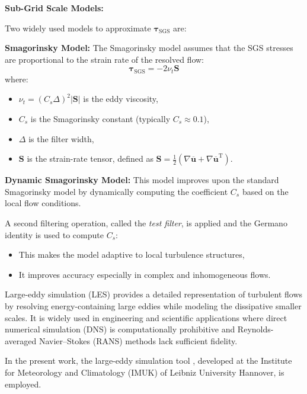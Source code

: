 \begin{tcolorbox}[colback=blue!5!white, colframe=blue!75!black]
\textbf{Sub-Grid Scale Models:}

Two widely used models to approximate $\boldsymbol{\tau}_{\mathrm{SGS}}$ are:

\vspace{1mm}
\textbf{Smagorinsky Model:} 
The Smagorinsky model assumes that the SGS stresses are proportional to the strain rate of the resolved flow:
\begin{equation}
\boldsymbol{\tau}_{\mathrm{SGS}} = -2 \nu_t \mathbf{S}
\end{equation}
where:
\begin{itemize}
    \item $\nu_t = (C_s \Delta)^2 |\mathbf{S}|$ is the eddy viscosity,
    \item $C_s$ is the Smagorinsky constant (typically $C_s \approx 0.1$),
    \item $\Delta$ is the filter width,
    \item $\mathbf{S}$ is the strain-rate tensor, defined as $\mathbf{S} = \frac{1}{2} \left( \nabla \overline{\mathbf{u}} + \nabla \overline{\mathbf{u}}^{\mathrm{T}} \right)$.
\end{itemize}

\vspace{2mm}
\textbf{Dynamic Smagorinsky Model:} 
This model improves upon the standard Smagorinsky model by dynamically computing the coefficient $C_s$ based on the local flow conditions. 

A second filtering operation, called the \textit{test filter}, is applied and the Germano identity is used to compute $C_s$:
\begin{itemize}
    \item This makes the model adaptive to local turbulence structures,
    \item It improves accuracy especially in complex and inhomogeneous flows.
\end{itemize}
\end{tcolorbox}

Large-eddy simulation (LES) provides a detailed representation of turbulent flows by resolving energy-containing large eddies while modeling the dissipative smaller scales. It is widely used in engineering and scientific applications where direct numerical simulation (DNS) is computationally prohibitive and Reynolds-averaged Navier–Stokes (RANS) methods lack sufficient fidelity.

In the present work, the large-eddy simulation tool  \cite{maronga2015}, developed at the Institute for Meteorology and Climatology (IMUK) of Leibniz University Hannover, is employed.


